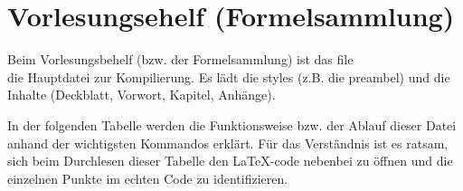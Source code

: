 \section{Vorlesungsehelf (Formelsammlung)}

Beim Vorlesungsbehelf (bzw. der \glqq{}Formelsammlung\grqq{}) ist das file
\\ die Hauptdatei zur Kompilierung.
Es lädt die styles (z.B. die preambel) und die Inhalte (Deckblatt, Vorwort,
Kapitel, Anhänge).

In der folgenden Tabelle werden die Funktionsweise bzw. der Ablauf dieser
Datei anhand der wichtigsten Kommandos erklärt. Für das Verständnis ist es
ratsam, sich beim Durchlesen dieser Tabelle den \LaTeX-code nebenbei zu öffnen
und die einzelnen Punkte im echten Code zu identifizieren.

\newpage
\begin{center}
\large{}
\end{center}


